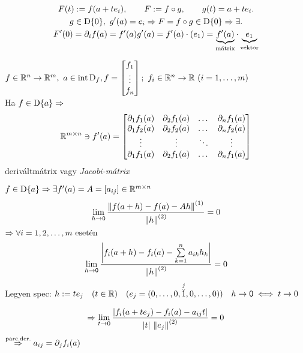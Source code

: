 \begin{biz}
  \begin{gather*}
  F(t) := f(a+te_i),\qquad F:=f\circ g,\qquad g(t)=a+te_i.\\
  g\in\operatorname{D}\{0\},\ g'(a)=e_i\Rightarrow F=f\circ g\in\operatorname{D}\{0\}\Rightarrow \exists.\\
  F'(0) = \partial_i f(a) = f'(a)g'(a) = f'(a)\cdot(e_1) = \underbrace{f'(a)}_{\text{mátrix}} \cdot
  \underbrace{e_1}_{\text{vektor}}
  \end{gather*}
\end{biz}

\begin{te}
  $f\in\RnRm,\ a\in\intD_f,\\ f=\begin{bmatrix}f_1\\\vdots\\f_n\end{bmatrix};\ f_i\in\RnR\ (i=1,\dotsc,m)$\\
  \vspace{.1em}
  Ha $f\in\operatorname{D}\{a\}\Rightarrow\\$
  \[\mathbb{R}^{m\times n}\owns f'(a) = \begin{bmatrix}
    \partial_1 f_1(a) & \partial_2 f_1(a) & \dots & \partial_n f_1(a)\\
    \partial_1 f_2(a) & \partial_2 f_2(a) & \dots & \partial_n f_2(a)\\
    \vdots & \vdots & \ddots & \vdots \\
    \partial_1 f_1(a) & \partial_2 f_1(a) & \dots & \partial_n f_1(a)
    \end{bmatrix}\]
  deriváltmátrix vagy \emph{Jacobi-mátrix}
\end{te}

\begin{biz}
    $f\in\operatorname{D}\{a\} \Rightarrow \exists f'(a) = A = \left[ a_{ij}\right] \in \mathbb{R}^{m\times n}$
    \[\displaystyle\lim_{h\to\mathsf{0}} \dfrac{\left\Vert f(a+h)-f(a) -Ah\right\Vert^{(1)}}{\left\Vert h\right\Vert^{(2)}}=0\]
    $\Rightarrow \forall i = 1,2,\dotsc,m \text{ esetén}$
    \[\displaystyle\lim_{h\to\mathsf{0}} \dfrac{\left|f_i(a+h)- f_i(a) - \sum\limits_{k=1}^n a_{ik} h_k\right|}{\left\Vert h\right\Vert^{(2)}}=0\]
    Legyen spec: $h := te_j\quad (t\in\mathbb{R})\quad (e_j = (0,\dotsc,0,\overset{j}{\breve{1}},0,\dotsc,0))\quad h\to\mathsf{0}
    \iff t\to0$

    \[\displaystyle\Rightarrow \lim_{t\to0}\dfrac{\left|f_i(a+te_j)-f_i(a) - a_{ij}t\right|}{|t|\,\left\Vert e_j\right\Vert^{(2)}} = 0\]
    $\overset{\text{parc.der.}}{\Rightarrow} a_{ij} = \partial_j f_i(a)$
\end{biz}

